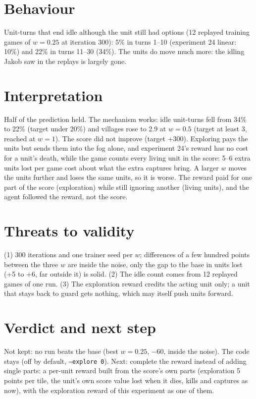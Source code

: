 \documentclass{../polyexp}
\begin{document}
\section{Behaviour}
Unit-turns that end idle although the unit still had options (12 replayed training games of $w = 0.25$ at
iteration 300): 5\% in turns 1--10 (experiment 24 linear: 10\%) and 22\% in turns 11--30 (34\%). The units do move
much more: the idling Jakob saw in the replays is largely gone.

\section{Interpretation}
Half of the prediction held. The mechanism works: idle unit-turns fell from 34\% to 22\% (target under 20\%) and
villages rose to 2.9 at $w = 0.5$ (target at least 3, reached at $w = 1$). The score did not improve (target +300).
Exploring pays the units but sends them into the fog alone, and experiment 24's reward has no cost for a unit's
death, while the game counts every living unit in the score: 5--6 extra units lost per game cost about what the
extra captures bring. A larger $w$ moves the units further and loses the same units, so it is worse. The reward
paid for one part of the score (exploration) while still ignoring another (living units), and the agent followed
the reward, not the score.

\section{Threats to validity}
(1) 300 iterations and one trainer seed per $w$; differences of a few hundred points between the three $w$ are
inside the noise, only the gap to the base in units lost (+5 to +6, far outside it) is solid. (2) The idle count
comes from 12 replayed games of one run. (3) The exploration reward credits the acting unit only; a unit that
stays back to guard gets nothing, which may itself push units forward.

\section{Verdict and next step}
Not kept: no run beats the base (best $w = 0.25$, $-60$, inside the noise). The code stays (off by default,
\texttt{--explore 0}). Next: complete the reward instead of adding single parts: a per-unit reward built from the
score's own parts (exploration 5 points per tile, the unit's own score value lost when it dies, kills and captures as
now), with the exploration reward of this experiment as one of them.
\end{document}
